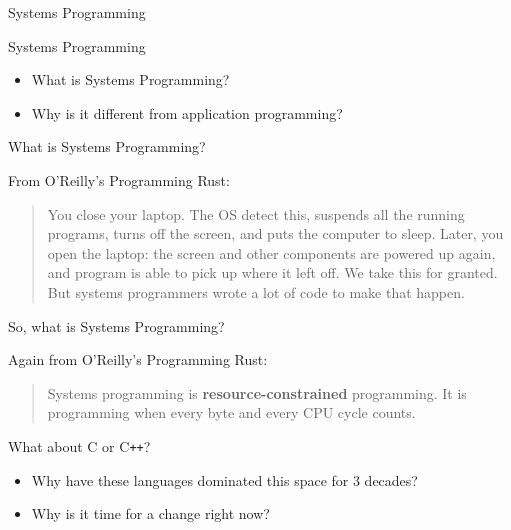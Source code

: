 \begin{section}{Systems Programming}

  \begin{frame}{Systems Programming}
    \begin{itemize}
    \item What is Systems Programming?
    \item Why is it different from application programming?
    \end{itemize}
  \end{frame}

  \begin{frame}{What is Systems Programming?}
    \begin{block}{From O'Reilly's Programming Rust\cite{ProgRustPreface1}:}
      \begin{quotation}
        You close your laptop. The OS detect this, suspends all the
        running programs, turns off the screen, and puts the computer to
        sleep. Later, you open the laptop: the screen and other components are
        powered up again, and program is able to pick up where it left
        off. We take this for granted. But systems programmers wrote a lot of
        code to make that happen.
      \end{quotation}
    \end{block}
  \end{frame}

  \begin{frame}{So, what is Systems Programming?}
    \begin{block}{Again from O'Reilly's Programming Rust\cite{ProgRustPreface2}:}
      \begin{quotation}
        Systems programming is \textbf{resource-constrained}
        programming. It is programming when every byte and every CPU cycle
        counts.
      \end{quotation}
    \end{block}
  \end{frame}

  \begin{frame}{What about C or C\texttt{++}?}
    \begin{itemize}
    \item Why have these languages dominated this space for 3 decades?
    \item Why is it time for a change right now?
    \end{itemize}
  \end{frame}

\end{section}
